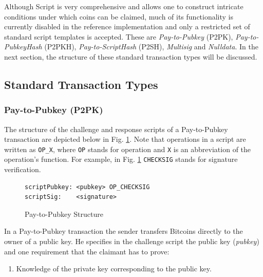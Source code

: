 Although Script is very comprehensive and allows one to construct intricate conditions under which coins can be claimed, much of its functionality is currently disabled in the reference implementation and only a restricted set of standard script templates is accepted. These are \textit{Pay-to-Pubkey} (P2PK), \textit{Pay-to-PubkeyHash} (P2PKH), \textit{Pay-to-ScriptHash} (P2SH), \textit{Multisig} and \textit{Nulldata}. In the next section, the structure of these standard transaction types will be discussed.~\\


\clearpage
\enlargethispage{2\baselineskip}
\subsection{Standard Transaction Types} \label{sec:StandardTxTypes}
\vspace{6pt}

\subsubsection{Pay-to-Pubkey (P2PK)} \label{sec:P2PK}
The structure of the challenge and response scripts of a Pay-to-Pubkey transaction are depicted below in Fig. \ref{fig:P2PubStructure}. Note that operations in a script are written as \texttt{OP\_X}, where \texttt{OP} stands for operation and \texttt{X} is an abbreviation of the operation's function. For example, in Fig. \ref{fig:P2PubStructure} \texttt{CHECKSIG} stands for signature verification.

\vspace{-10pt}
\begin{figure}[htbp]

\begin{Verbatim}[fontsize==\relsize{-4}, frame=single]  
scriptPubkey: <pubkey> OP_CHECKSIG
scriptSig:    <signature>
\end{Verbatim}

\vspace{-15pt}
\caption{Pay-to-Pubkey Structure}
\label{fig:P2PubStructure}
\end{figure}
\vspace{-10pt}

\noindent
In a Pay-to-Pubkey transaction the sender transfers Bitcoins directly to the owner of a public key. He specifies in the challenge script the public key (\textit{pubkey}) and one requirement that the claimant has to prove:
\begin{enumerate}[label=\arabic*), leftmargin=1cm]
\item Knowledge of the private key corresponding to the public key.
\end{enumerate}


